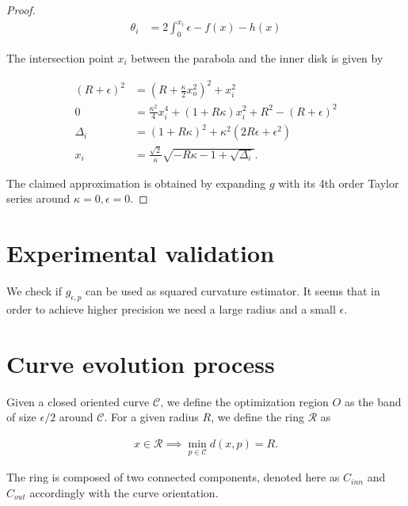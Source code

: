 \begin{proof}
\begin{align*}
	\theta_i &= 2\int_{0}^{x_i}{\epsilon - f(x) - h(x)}	\end{align*}

The intersection point $x_i$ between the parabola and the inner disk is given by
	
\begin{align*}
	(R+\epsilon)^2 &= (R+\frac{\kappa}{2}x_o^2)^2 + x_i^2\\
	0 &= \frac{\kappa^2}{4}x_i^4 + (1+R\kappa)x_i^2 + R^2 - (R+\epsilon)^2	\\
\Delta_i &= (1+R\kappa)^2 + \kappa^2(2R\epsilon + \epsilon^2)\\
x_i &= \frac{\sqrt{2}}{\kappa}\sqrt{-R\kappa-1+\sqrt{\Delta_i}}.
\end{align*}

The claimed approximation is obtained by expanding $g$ with its  4th order Taylor series around $\kappa=0,\epsilon=0$.
\end{proof}

\section{Experimental validation}

We check if $g_{\epsilon,p}$ can be used as squared curvature estimator. It seems that in order to achieve higher precision we need a large radius and a small $\epsilon$.



\section{Curve evolution process}

Given a closed oriented curve $\mathcal{C}$, we define the optimization region $O$ as the band of size $\epsilon /2$ around $\mathcal{C}$. For a given radius $R$, we define the ring $\mathcal{R}$ as

\begin{align*}
	x \in \mathcal{R} \implies \min_{p \in \mathcal{C}} d(x,p) = R.
\end{align*}

The ring is composed of two connected components, denoted here as $C_{inn}$ and $C_{out}$ accordingly with the curve orientation.


